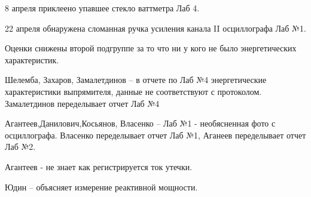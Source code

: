 \documentclass[a4paper,11pt]{article}
\begin{document}
\vskip 1cm
8 апреля приклеено упавшее стекло ваттметра Лаб 4.

22 апреля обнаружена сломанная ручка усиления канала II осциллографа Лаб №1.

Оценки снижены второй подгруппе за то что ни у кого не было энергетических 
характеристик.

Шелемба, Захаров, Замалетдинов -- в отчете по Лаб №4 
энергетические характеристики выпрямителя,
данные не соответствуют с протоколом. Замалетдинов переделывает отчет Лаб №4

Агантеев,Данилович,Косьянов, Власенко -- Лаб №1 - необясненная фото с осциллографа.
Власенко переделывает отчет Лаб №1, Аганеев переделывает отчет Лаб №2.

Агантеев - не знает как регистрируется ток утечки.

Юдин -- объясняет измерение реактивной мощности.
\end{document}
